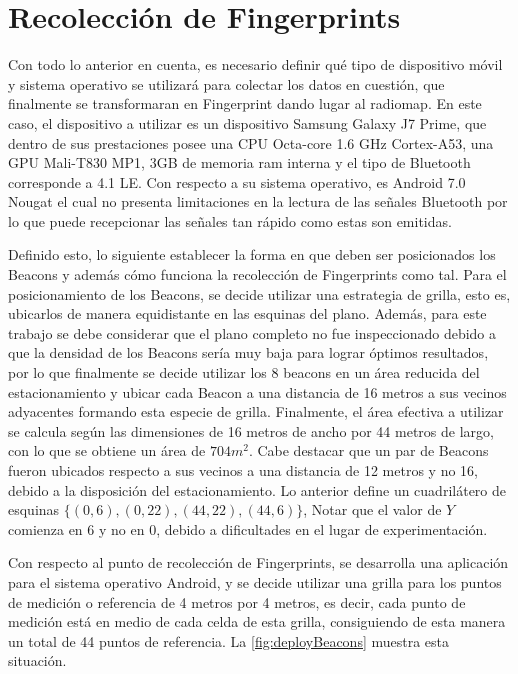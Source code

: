 \section{Recolección de Fingerprints}

Con todo lo anterior en cuenta, es necesario definir qué tipo de dispositivo móvil y sistema operativo se utilizará para colectar los datos en cuestión, que finalmente se transformaran en Fingerprint dando lugar al radiomap. En este caso, el dispositivo a utilizar es un dispositivo Samsung Galaxy J7 Prime, que dentro de sus prestaciones posee una CPU Octa-core 1.6 GHz Cortex-A53, una GPU Mali-T830 MP1, 3GB de memoria ram interna y el tipo de Bluetooth corresponde a 4.1 LE. Con respecto a su sistema operativo, es Android 7.0 Nougat el cual no presenta limitaciones en la lectura de las señales Bluetooth por lo que puede recepcionar las señales tan rápido como estas son emitidas.

Definido esto, lo siguiente establecer la forma en que deben ser posicionados los Beacons y además cómo funciona la recolección de Fingerprints como tal. Para el posicionamiento de los Beacons, se decide utilizar una estrategia de grilla, esto es, ubicarlos de manera equidistante en las esquinas del plano. Además, para este trabajo se debe considerar que el plano completo no fue inspeccionado debido a que la densidad de los Beacons sería muy baja para lograr óptimos resultados, por lo que finalmente se decide utilizar los 8 beacons en un área reducida del estacionamiento y ubicar cada Beacon a una distancia de 16 metros a sus vecinos adyacentes formando esta especie de grilla. Finalmente, el área efectiva a utilizar se calcula según las dimensiones de 16 metros de ancho por 44 metros de largo, con lo que se obtiene un área de $704m^2$. Cabe destacar que un par de Beacons fueron ubicados respecto a sus vecinos a una distancia de 12 metros y no 16, debido a la disposición del estacionamiento.  Lo anterior define un cuadrilátero de esquinas $ \{(0,6), (0, 22), (44,22) , (44,6)\} $, Notar que el valor de $Y$ comienza en $6$ y no en $0$, debido a dificultades en el lugar de experimentación.

Con respecto al punto de recolección de Fingerprints, se desarrolla una aplicación para el sistema operativo Android, y se decide utilizar una grilla para los puntos de medición o referencia de 4 metros por 4 metros, es decir, cada punto de medición está en medio de cada celda de esta grilla, consiguiendo de esta manera un total de 44 puntos de referencia. La \autoref{fig:deployBeacons} muestra esta situación.



